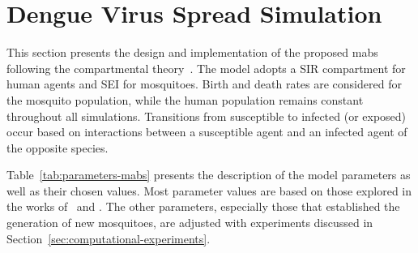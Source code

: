 \section{Dengue Virus Spread Simulation}\label{sec:dengue-virus-spread-simulation}

This section presents the design and implementation of the proposed \gls{mabs}
following the compartmental theory~\citep{amaku:2014}. The model adopts a SIR
compartment for human agents and SEI for mosquitoes. Birth and death rates are
considered for the mosquito population, while the human population remains
constant throughout all simulations. Transitions from susceptible to infected
(or exposed) occur based on interactions between a susceptible agent and an
infected agent of the opposite species.

Table~\ref{tab:parameters-mabs} presents the description of the model parameters
as well as their chosen values. Most parameter values are based on those
explored in the works of~\cite{da-silva:2020} and \cite{dwivedi:2022}. The other
parameters, especially those that established the generation of new mosquitoes,
are adjusted with experiments discussed in
Section~\ref{sec:computational-experiments}.

